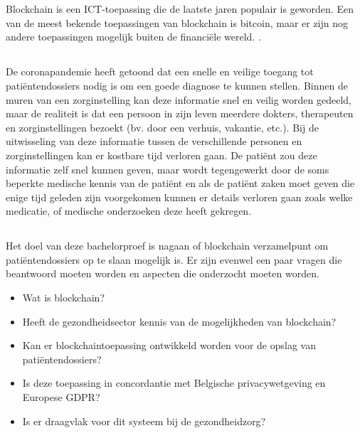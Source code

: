 
\chapter{}
\label{ch:inleiding}

Blockchain is een ICT-toepassing die de laatste jaren populair is geworden. Een van de meest bekende toepassingen van blockchain is bitcoin, maar er zijn nog andere toepassingen mogelijk buiten de financiële wereld. \autocite{Pilkington2016}.

\section{}
\label{sec:probleemstelling}

De coronapandemie heeft getoond dat een snelle en veilige toegang tot patiëntendossiers nodig is om een goede diagnose te kunnen stellen. Binnen de muren van een zorginstelling kan deze informatie snel en veilig worden gedeeld, maar de realiteit is dat een persoon in zijn leven meerdere dokters, therapeuten en zorginstellingen bezoekt (bv. door een verhuis, vakantie, etc.). Bij de uitwisseling van deze informatie tussen de verschillende personen en zorginstellingen kan er kostbare tijd verloren gaan. De patiënt zou deze informatie zelf snel kunnen geven, maar wordt tegengewerkt door de soms beperkte medische kennis van de patiënt en als de patiënt zaken moet geven die enige tijd geleden zijn voorgekomen kunnen er details verloren gaan zoals welke medicatie, of medische onderzoeken deze heeft gekregen. \autocite{Aiqing2018}

\section{}
\label{sec:onderzoeksvraag}

Het doel van deze bachelorproef is nagaan of blockchain verzamelpunt om patiëntendossiers op te slaan mogelijk is. Er zijn evenwel een paar vragen die beantwoord moeten worden en aspecten die onderzocht moeten worden.

\begin{itemize}
    \item Wat is blockchain?
    \item Heeft de gezondheidsector kennis van de mogelijkheden van blockchain?
    \item Kan er blockchaintoepassing ontwikkeld worden voor de opslag van patiëntendossiers?
    \item Is deze toepassing in concordantie met Belgische privacywetgeving en Europese GDPR?
    \item Is er draagvlak voor dit systeem bij de gezondheidzorg?
    
\end{itemize}

